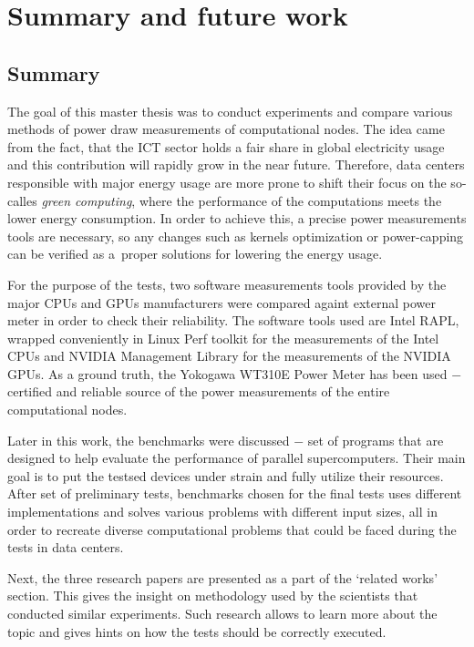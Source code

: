 \chapter{Summary and future work}

\section{Summary}

The goal of this master thesis was to conduct experiments and compare various
methods of power draw measurements of computational nodes. The idea came from
the fact, that the ICT sector holds a fair share in global electricity usage
and this contribution will rapidly grow in the near future. Therefore, data
centers responsible with major energy usage are more prone to shift their
focus on the so-calles \emph{green computing}, where the performance of the
computations meets the lower energy consumption. In order to achieve this,
a precise power measurements tools are necessary, so any changes such as
kernels optimization or power-capping can be verified as a~proper solutions
for lowering the energy usage.

For the purpose of the tests, two software measurements tools provided by the
major CPUs and GPUs manufacturers were compared againt external power meter
in order to check their reliability. The software tools used are Intel RAPL,
wrapped conveniently in Linux Perf toolkit for the measurements of the Intel
CPUs and NVIDIA Management Library for the measurements of the NVIDIA GPUs.
As a ground truth, the Yokogawa WT310E Power Meter has been used $-$ certified
and reliable source of the power measurements of the entire computational
nodes.

Later in this work, the benchmarks were discussed $-$ set of programs that
are designed to help evaluate the performance of parallel supercomputers.
Their main goal is to put the testsed devices under strain and fully utilize
their resources. After set of preliminary tests, benchmarks chosen for the
final tests uses different implementations and solves various problems with
different input sizes, all in order to recreate diverse computational problems
that could be faced during the tests in data centers.

Next, the three research papers are presented as a part of the `related works'
section. This gives the insight on methodology used by the scientists that
conducted similar experiments. Such research allows to learn more about the
topic and gives hints on how the tests should be correctly executed.

